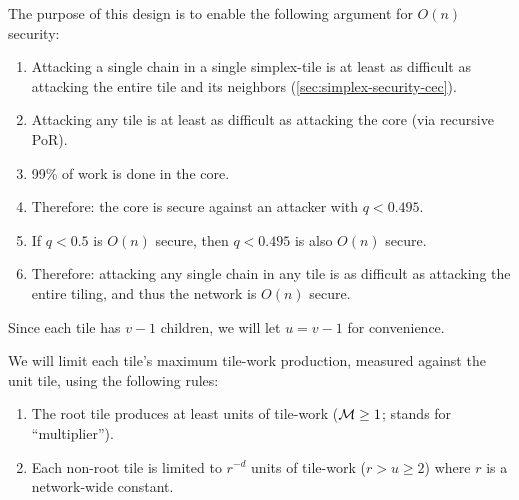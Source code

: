 The purpose of this design is to enable the following argument for $O(n)$ security:
\begin{enumerate}
    \item Attacking a single chain in a single simplex-tile is at least as difficult as attacking the entire tile and its neighbors (\autoref{sec:simplex-security-cec}).
    \item Attacking any tile is at least as difficult as attacking the core (via recursive PoR).
    \item 99\% of work is done in the core.
    \item Therefore: the core is secure against an attacker with $q < 0.495$.
    \item If $q < 0.5$ is $O(n)$ secure, then $q < 0.495$ is also $O(n)$ secure.
    \item Therefore: attacking any single chain in any tile is as difficult as attacking the entire tiling, and thus the network is $O(n)$ secure.
\end{enumerate}



Since each tile has $v-1$ children, we will let $u = v-1$ for convenience.

We will limit each tile's maximum tile-work production, measured against the unit tile, using the following rules:
\begin{enumerate}
    \item The root tile produces at least \Mroot units of tile-work ($\mathcal{M} \ge 1$; \Mroot stands for ``multiplier'').
    \item Each non-root tile is limited to $r^{-d}$ units of tile-work ($r > u \ge 2$) where $r$ is a network-wide constant.
\end{enumerate}


